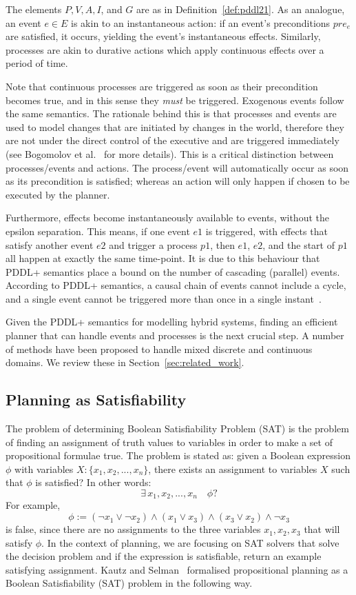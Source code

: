 The elements $P,V,A,I$, and $G$ are as in Definition~\ref{def:pddl21}. As an analogue, an event $e\in E$ is akin to an instantaneous action: if an event's preconditions $pre_e$ are satisfied, it occurs, yielding the event's instantaneous effects. Similarly, processes are akin to durative actions which apply continuous effects over a period of time.

Note that continuous processes are triggered as soon as their precondition becomes true, and in this sense they \textit{must} be triggered. Exogenous events follow the same semantics. The rationale behind this is that processes and events are used to model changes that are initiated by changes in the world, therefore they are not under the direct control of the executive and are triggered immediately (see Bogomolov et al.~\cite{bogomolov14} for more details). This is a critical distinction between processes/events and actions. The process/event will automatically occur as soon as its precondition is satisfied; whereas an action will only happen if chosen to be executed by the planner.

Furthermore, effects become instantaneously available to events, without the epsilon separation. This means, if one event $e1$ is triggered, with effects that satisfy another event $e2$ and trigger a process $p1$, then $e1$, $e2$, and the start of $p1$ all happen at exactly the same time-point. It is due to this behaviour that PDDL+ semantics place a bound on the number of cascading (parallel) events. According to PDDL+ semantics, a causal chain of events cannot include a cycle, and a single event cannot be triggered more than once in a single instant~\cite{fox2002pddl+}.

Given the PDDL+ semantics for modelling hybrid systems, finding an efficient planner that can handle events and processes is the next crucial step. A number of methods have been proposed to handle mixed discrete and continuous domains. We review these in Section~\ref{sec:related_work}.

\subsection{Planning as Satisfiability}

The problem of determining Boolean Satisfiability Problem (SAT) is the problem of finding an assignment of truth values to variables in order to make a set of propositional formulae true. The problem is stated as: given a Boolean expression $\phi$ with variables $X: \{ x_1, x_2, ... , x_n\}$, there exists an assignment to variables $X$ such that $\phi$ is satisfied? In other words:
$$
\exists \, x_1, x_2, ... , x_n \quad\phi?
$$
For example,
$$
\phi := (\neg x_1 \vee \neg x_2) \wedge (x_1 \vee x_3) \wedge (x_3 \vee x_2) \wedge \neg x_3
$$
is false, since there are no assignments to the three variables $x_1, x_2, x_3$ that will satisfy $\phi$.
%
In the context of planning, we are focusing on SAT solvers that solve the decision problem and if the expression is satisfiable, return an example satisfying assignment. Kautz and Selman~\cite{kau92} formalised propositional planning as a Boolean Satisfiability (SAT) problem in the following way.

